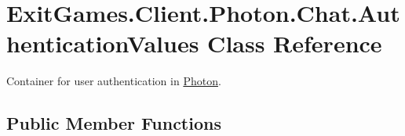 \hypertarget{class_exit_games_1_1_client_1_1_photon_1_1_chat_1_1_authentication_values}{}\section{Exit\+Games.\+Client.\+Photon.\+Chat.\+Authentication\+Values Class Reference}
\label{class_exit_games_1_1_client_1_1_photon_1_1_chat_1_1_authentication_values}


Container for user authentication in \hyperlink{namespace_exit_games_1_1_client_1_1_photon}{Photon}.  


\subsection*{Public Member Functions}
